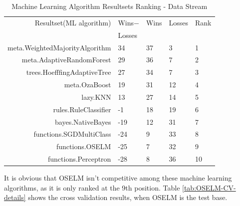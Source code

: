 \documentclass[a4paper, 14pt]{extarticle}
\begin{document}
\begin{table}[thb]
\caption{\label{tab:multiRank_datastream}Machine Learning Algorithm Resultsets Ranking  - Data Stream}
\footnotesize
{\centering \begin{tabular}{rllll}\\
\hline
Resultset(ML algorithm) & Wins$-$ & Wins & Losses & Rank\\
& Losses & & &\\
\hline
meta.WeightedMajorityAlgorithm &  34 & 37  &   3 & 1\\
meta.AdaptiveRandomForest &  29 &  36 &   7 & 2\\
trees.HoefffingAdaptiveTree &  27 &  34 &   7 & 3\\
meta.OzaBoost &  19 &  31 &  12 & 4\\
lazy.KNN &  13 &  27 &  14 & 5\\
rules.RuleClassifier&   -1 &  18 &  19 & 6\\
bayes.NativeBayes &  -19 &  12 &  31 & 7\\
functions.SGDMultiClass & -24 &  9 &  33 & 8\\
functions.OSELM & -25 &  7 &  32 & 9\\
functions.Perceptron & -28 &   8 &  36 & 10\\
\hline
\end{tabular} \footnotesize \par}
\end{table}
\par It is obvious that OSELM isn't competitive among these machine learning algorithms, as it is only ranked at the 9th position. Table \ref{tab:OSELM-CV-details} shows the cross validation results, when OSELM is the test base. 
\newpage
\end{document}
